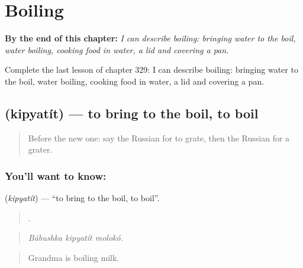 
\chapter{Boiling}
\label{ch:ru-boiling}

\begin{chapteropening}
\textbf{By the end of this chapter:} \emph{I can describe boiling: bringing water to the boil, water boiling, cooking food in water, a lid and covering a pan.}

Complete the last lesson of chapter 329: I can describe boiling: bringing water to the boil, water boiling, cooking food in water, a lid and covering a pan.
\end{chapteropening}

\section[\texorpdfstring{\ru{кипятить} (kipyatít)}{кипятить (kipyatít)}]{ (kipyatít) — to bring to the boil, to boil}

\label{lesson:RU-C329-kipyatit}



\begin{quote}
Before the new one: say the Russian for to grate, then the Russian for a grater.
\end{quote}

\subsection*{You'll want to know: }
\textbf{} (\emph{kipyatít}) — \textquotedblleft{}to bring to the boil, to boil\textquotedblright{}.

\begin{quote}
  .
\end{quote}

\begin{quote}
\emph{Bábushka kipyatít molokó.}
\end{quote}

\begin{quote}
Grandma is boiling milk.
\end{quote}

